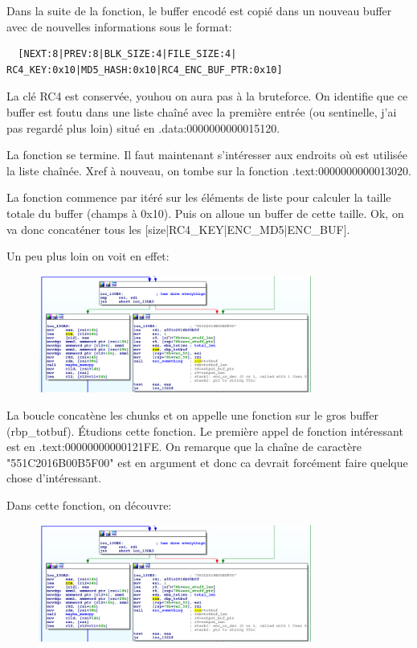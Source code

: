 \documentclass[14pt]{article}
\begin{document}
Dans la suite de la fonction, le buffer encodé est copié dans un nouveau buffer avec de nouvelles informations sous le format:
\begin{verbatim}
  [NEXT:8|PREV:8|BLK_SIZE:4|FILE_SIZE:4| RC4_KEY:0x10|MD5_HASH:0x10|RC4_ENC_BUF_PTR:0x10]
\end{verbatim}
La clé RC4 est conservée, youhou on aura pas à la bruteforce.
On identifie que ce buffer est foutu dans une liste chaîné avec la première entrée (ou sentinelle, j'ai pas regardé plus loin) situé en .data:0000000000015120.

La fonction se termine. Il faut maintenant s'intéresser aux endroits où est utilisée la liste chaînée.
Xref à nouveau, on tombe sur la fonction .text:0000000000013020.

La fonction commence par itéré sur les éléments de liste pour calculer la taille totale du buffer (champs à 0x10). Puis on alloue un buffer de cette taille. Ok, on va donc concaténer tous les [size|RC4\_KEY|ENC\_MD5|ENC\_BUF].

Un peu plus loin on voit en effet:
\begin{figure}[H]
\includegraphics[width=0.8\textwidth]{./imgs/usb_driver_concat_rc5.png}
\centering
\end{figure}

La boucle concatène les chunks et on appelle une fonction sur le gros buffer (rbp\_totbuf).
Étudions cette fonction. Le première appel de fonction intéressant est en .text:00000000000121FE. On remarque que la chaîne de caractère "551C2016B00B5F00" est en argument et donc ca devrait forcément faire quelque chose d'intéressant.

Dans cette fonction, on découvre:
\begin{figure}[H]
\includegraphics[width=0.8\textwidth]{./imgs/usb_driver_concat_rc5.png}
\centering
\end{figure}
\end{document}
